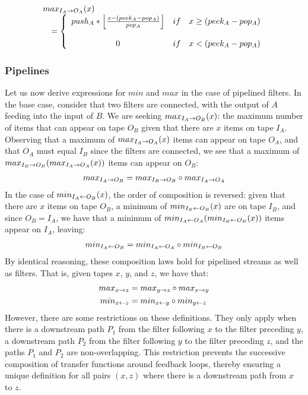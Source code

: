 \[
\begin{array}{l}
\ma{I_A}{O_A}(x)  \\ 
\makebox[.1in]{ } = \left\{
\begin{array}{ccl}
push_A*\left\lfloor\frac{x-(peek_A-pop_A)}{pop_A}\right\rfloor & if & x \ge (peek_A-pop_A) \\
 & \\
0 & if & x < (peek_A-pop_A) \\
\end{array} \right.
\end{array}
\]

\subsubsection{Pipelines}

Let us now derive expressions for $min$ and $max$ in the case of
pipelined filters.  In the base case, consider that two filters are
connected, with the output of $A$ feeding into the input of $B$.  We
are seeking $max_{I_A \rightarrow O_B}(x)$: the maximum number of items that can
appear on tape $O_B$ given that there are $x$ items on tape $I_A$.
Observing that a maximum of $max_{I_A \rightarrow O_A}(x)$ items can appear on
tape $O_A$, and that $O_A$ must equal $I_B$ since the filters are
connected, we see that a maximum of $max_{I_B \rightarrow O_B}(max_{I_A \rightarrow O_A}(x))$
items can appear on $O_B$:
\begin{align*}
max_{I_A \rightarrow O_B} = max_{I_B \rightarrow O_B} \circ max_{I_A \rightarrow O_A}
\end{align*}
In the case of $min_{I_A \leftarrow O_B}(x)$, the order of composition is
reversed: given that there are $x$ items on tape $O_B$, a minimum of
$min_{I_B \leftarrow O_B}(x)$ are on tape $I_B$, and since $O_B = I_A$, we have
that a minimum of $min_{I_A \leftarrow O_A}(min_{I_B \leftarrow O_B}(x))$ items appear on
$I_A$, leaving:
\begin{align*}
min_{I_A \leftarrow O_B} = min_{I_A \leftarrow O_A} \circ min_{I_B \leftarrow O_B}
\end{align*}
By identical reasoning, these composition laws hold for pipelined
streams as well as filters.  That is, given tapes $x$, $y$, and $z$, 
we have that:
\begin{align}
\label{eq:compose}
\begin{split}
max_{x \rightarrow z} &= max_{y \rightarrow z} \circ max_{x \rightarrow y} \\
min_{x \leftarrow z} &= min_{x \leftarrow y} \circ min_{y \leftarrow z}
\end{split}
\end{align}
However, there are some restrictions on these definitions.  They only
apply when there is a downstream path $P_1$ from the filter following
$x$ to the filter preceding $y$, a downstream path $P_2$ from the
filter following $y$ to the filter preceding $z$, and the paths $P_1$
and $P_2$ are non-overlapping.  This restriction prevents the
successive composition of transfer functions around feedback loops,
thereby ensuring a unique definition for all pairs $(x, z)$ where
there is a downstream path from $x$ to $z$.

